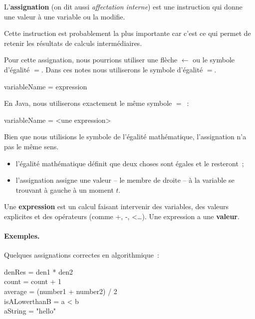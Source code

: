 			L’\textbf{assignation}
			(on dit aussi \emph{affectation interne})
			est une instruction qui donne une valeur 
			à une variable ou la modifie.
	
			Cette instruction est probablement la plus importante
			car c’est ce qui permet de retenir les résultats 
			de calculs intermédiaires.

			Pour cette assignation, nous pourrions utiliser une flèche
			$\leftarrow$ ou le symbole d'égalité $=$. Dans ces notes nous
			utiliserons le symbole d'égalité $=$.

			\begin{langagenaturel}
				variableName = expression
			\end{langagenaturel}

			En Java, nous utiliserons exactement le même symbole $=$~:

			\begin{java}
variableName = <une expression>				
			\end{java}

			Bien que nous utilisions le symbole de l'égalité mathématique, 
			l'assignation n'a pas le même sens. 

			\begin{itemize}
				\item l'égalité mathématique définit que deux choses sont égales 
					et le resteront~;
				\item l'assignation assigne une valeur -- le membre de droite -- 
					à la variable se trouvant à gauche à un moment $t$.
			\end{itemize}
				
			Une \textbf{expression} est un calcul faisant
			intervenir des variables, des valeurs explicites et des opérateurs
			(comme +, -, <\dots).  Une expression a une \textbf{valeur}.
					
			\paragraph{Exemples.}
				
				Quelques assignations correctes en algorithmique~:
				
				\begin{langagenaturel}
					 denRes = den1 * den2\\
					 count = count + 1\\
					 average = (number1 + number2) / 2\\
					 isALowerthanB = a < b \\
					 aString = "hello"\\
				\end{langagenaturel}

